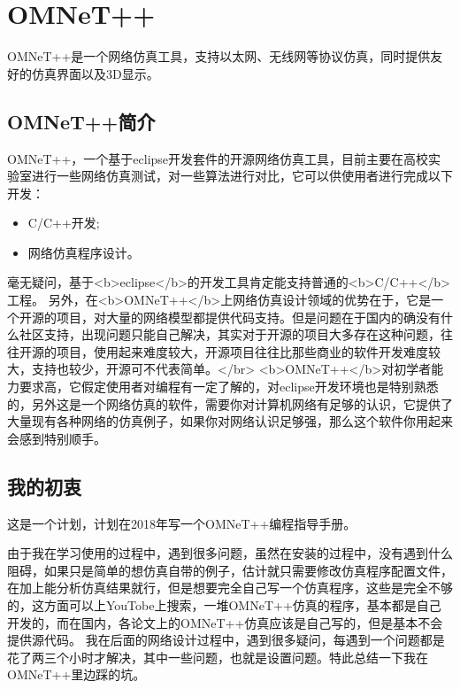 \chapter{OMNeT++}

\begin{summary}
OMNeT++是一个网络仿真工具，支持以太网、无线网等协议仿真，同时提供友好的仿真界面以及3D显示。
\\
\end{summary}

\section{OMNeT++简介}

OMNeT++，一个基于eclipse开发套件的开源网络仿真工具，目前主要在高校实验室进行一些网络仿真测试，对一些算法进行对比，它可以供使用者进行完成以下开发：
\begin{itemize}
\item C/C++开发;
\item 网络仿真程序设计。
\end{itemize}
毫无疑问，基于<b>eclipse</b>的开发工具肯定能支持普通的<b>C/C++</b>工程。
另外，在<b>OMNeT++</b>上网络仿真设计领域的优势在于，它是一个开源的项目，对大量的网络模型都提供代码支持。但是问题在于国内的确没有什么社区支持，出现问题只能自己解决，其实对于开源的项目大多存在这种问题，往往开源的项目，使用起来难度较大，开源项目往往比那些商业的软件开发难度较大，支持也较少，开源可不代表简单。</br>
<b>OMNeT++</b>对初学者能力要求高，它假定使用者对编程有一定了解的，对eclipse开发环境也是特别熟悉的，另外这是一个网络仿真的软件，需要你对计算机网络有足够的认识，它提供了大量现有各种网络的仿真例子，如果你对网络认识足够强，那么这个软件你用起来会感到特别顺手。
\\
\section{我的初衷}

这是一个计划，计划在2018年写一个OMNeT++编程指导手册。

\begin{definition}
  由于我在学习使用的过程中，遇到很多问题，虽然在安装的过程中，没有遇到什么阻碍，如果只是简单的想仿真自带的例子，估计就只需要修改仿真程序配置文件，在加上能分析仿真结果就行，但是想要完全自己写一个仿真程序，这些是完全不够的，这方面可以上YouTobe上搜索，一堆OMNeT++仿真的程序，基本都是自己开发的，而在国内，各论文上的OMNeT++仿真应该是自己写的，但是基本不会提供源代码。\newline
  我在后面的网络设计过程中，遇到很多疑问，每遇到一个问题都是花了两三个小时才解决，其中一些问题，也就是设置问题。特此总结一下我在OMNeT++里边踩的坑。
\end{definition}


